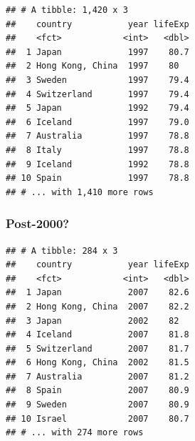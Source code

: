\documentclass[11pt,]{article}
\newenvironment{Shaded}{\begin{snugshade}}{\end{snugshade}}
\newcommand{\KeywordTok}[1]{\textcolor[rgb]{0.13,0.29,0.53}{\textbf{#1}}}
\newcommand{\DecValTok}[1]{\textcolor[rgb]{0.00,0.00,0.81}{#1}}
\newcommand{\StringTok}[1]{\textcolor[rgb]{0.31,0.60,0.02}{#1}}
\newcommand{\OperatorTok}[1]{\textcolor[rgb]{0.81,0.36,0.00}{\textbf{#1}}}
\newcommand{\NormalTok}[1]{#1}
\begin{document}
\begin{Shaded}
\end{Shaded}

\begin{verbatim}
## # A tibble: 1,420 x 3
##    country           year lifeExp
##    <fct>            <int>   <dbl>
##  1 Japan             1997    80.7
##  2 Hong Kong, China  1997    80  
##  3 Sweden            1997    79.4
##  4 Switzerland       1997    79.4
##  5 Japan             1992    79.4
##  6 Iceland           1997    79.0
##  7 Australia         1997    78.8
##  8 Italy             1997    78.8
##  9 Iceland           1992    78.8
## 10 Spain             1997    78.8
## # ... with 1,410 more rows
\end{verbatim}

\subsubsection{Post-2000?}\label{post-2000}

\begin{Shaded}
\end{Shaded}

\begin{verbatim}
## # A tibble: 284 x 3
##    country           year lifeExp
##    <fct>            <int>   <dbl>
##  1 Japan             2007    82.6
##  2 Hong Kong, China  2007    82.2
##  3 Japan             2002    82  
##  4 Iceland           2007    81.8
##  5 Switzerland       2007    81.7
##  6 Hong Kong, China  2002    81.5
##  7 Australia         2007    81.2
##  8 Spain             2007    80.9
##  9 Sweden            2007    80.9
## 10 Israel            2007    80.7
## # ... with 274 more rows
\end{verbatim}
\end{document}

